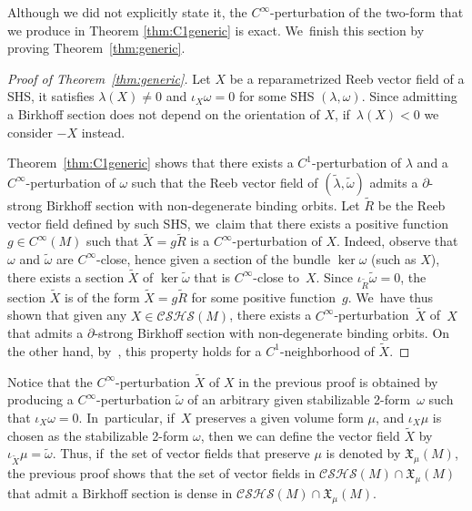 Although we did not explicitly state it, the $C^\infty$-perturbation of the two-form that we produce in Theorem \ref{thm:C1generic} is exact. We~finish this section by proving Theorem~\ref{thm:generic}.

\begin{proof}[Proof of Theorem~\ref{thm:generic}]
Let $X$ be a reparametrized Reeb vector field of a SHS, \ie it satisfies $\lambda(X)\neq 0$ and $\iota_X\omega=0$ for some SHS $(\lambda,\omega)$. Since admitting a Birkhoff section does not depend on the orientation of $X$, if~$\lambda(X)<0$ we consider $-X$ instead.

Theorem~\ref{thm:C1generic} shows that there exists a $C^1$-perturbation of $\lambda$ and a $C^\infty$-perturba\-tion of $\omega$ such that the Reeb vector field of $(\widetilde \lambda, \widetilde \omega)$ admits a $\partial$-strong Birkhoff section with non-degenerate binding orbits. Let $\widetilde R$ be the Reeb vector field defined by such SHS, we~claim that there exists a positive function $g\in C^\infty(M)$ such that $\widetilde X=g\widetilde R$ is a $C^\infty$\nobreakdash-perturbation of $X$. Indeed, observe that $\omega$ and $\widetilde \omega$ are $C^\infty$-close, hence given a section of the bundle $\ker \omega$ (such as $X$), there exists a section $\widetilde X$ of $\ker \widetilde \omega$ that is $C^\infty$-close to~$X$. Since $\iota_{\widetilde R}\widetilde \omega=0$, the section $\widetilde X$ is of the form $\widetilde X=g\widetilde R$ for some positive function~$g$. We~have thus shown that given any $X\in \mathcal{CSHS}(M)$, there exists a $C^\infty$-perturbation~$\widetilde X$ of~$X$ that admits a $\partial$-strong Birkhoff section with non-degenerate binding orbits. On the other hand, by~\cite[\S 5]{CDHR}, this property holds for a $C^1$-neighborhood of $\widetilde X$.
\end{proof}

\begin{Remark}\label{rem:fixvol}
Notice that the $C^\infty$-perturbation $\widetilde X$ of $X$ in the previous proof is obtained by producing a $C^\infty$-perturbation $\widetilde \omega$ of an arbitrary given stabilizable 2-form~$\omega$ such that $\iota_X\omega=0$. In~particular, if~$X$ preserves a given volume form $\mu$, and $\iota_X\mu$ is chosen as the stabilizable 2-form $\omega$, then we can define the vector field $\widetilde X$ by $\iota_{\widetilde X}\mu=\widetilde \omega$. Thus, if~the set of vector fields that preserve $\mu$ is denoted by $\mathfrak{X}_\mu(M)$, the previous proof shows that the set of vector fields in $\mathcal{CSHS}(M)\cap \mathfrak{X}_\mu(M)$ that admit a Birkhoff section is dense in $\mathcal{CSHS}(M)\cap \mathfrak{X}_\mu(M)$.
\end{Remark}

